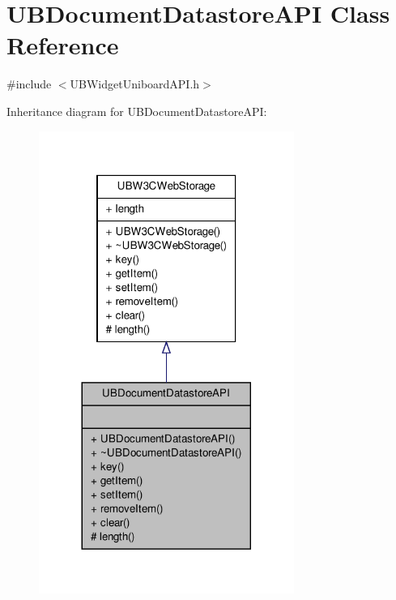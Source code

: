 \hypertarget{class_u_b_document_datastore_a_p_i}{\section{U\-B\-Document\-Datastore\-A\-P\-I Class Reference}
\label{d9/d24/class_u_b_document_datastore_a_p_i}
}


{\ttfamily \#include $<$U\-B\-Widget\-Uniboard\-A\-P\-I.\-h$>$}



Inheritance diagram for U\-B\-Document\-Datastore\-A\-P\-I\-:
\nopagebreak
\begin{figure}[H]
\begin{center}
\leavevmode
\includegraphics[width=236pt]{d2/d31/class_u_b_document_datastore_a_p_i__inherit__graph}
\end{center}
\end{figure}


